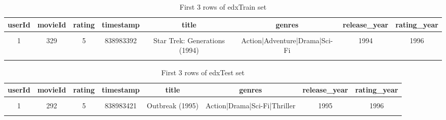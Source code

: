 \documentclass[
]{article}
\begin{document}
\begin{table}[H]

\caption{\label{tab:Table 2: first 3 rows of edxTrain set}First 3 rows of edxTrain set}
\centering
\fontsize{6.7}{8.7}\selectfont
\begin{tabular}[t]{|>{}c|||>{}c|||>{}c|||>{}c|||>{}c|||>{}c|||>{}c|||>{}c|}
\hline
userId & movieId & rating & timestamp & title & genres & release\_year & rating\_year\\
\hline
\cellcolor{gray!6}{1} & \cellcolor{gray!6}{185} & \cellcolor{gray!6}{5} & \cellcolor{gray!6}{838983525} & \cellcolor{gray!6}{Net, The (1995)} & \cellcolor{gray!6}{Action|Crime|Thriller} & \cellcolor{gray!6}{1995} & \cellcolor{gray!6}{1996}\\
\hline
1 & 329 & 5 & 838983392 & Star Trek: Generations (1994) & Action|Adventure|Drama|Sci-Fi & 1994 & 1996\\
\hline
\cellcolor{gray!6}{1} & \cellcolor{gray!6}{355} & \cellcolor{gray!6}{5} & \cellcolor{gray!6}{838984474} & \cellcolor{gray!6}{Flintstones, The (1994)} & \cellcolor{gray!6}{Children|Comedy|Fantasy} & \cellcolor{gray!6}{1994} & \cellcolor{gray!6}{1996}\\
\hline
\end{tabular}
\end{table}

\begin{table}[H]

\caption{\label{tab:Table 3: first 3 rows of edxTest set}First 3 rows of edxTest set}
\centering
\fontsize{8}{10}\selectfont
\begin{tabular}[t]{|>{}c|||>{}c|||>{}c|||>{}c|||>{}c|||>{}c|||>{}c|||>{}c|}
\hline
userId & movieId & rating & timestamp & title & genres & release\_year & rating\_year\\
\hline
\cellcolor{gray!6}{1} & \cellcolor{gray!6}{122} & \cellcolor{gray!6}{5} & \cellcolor{gray!6}{838985046} & \cellcolor{gray!6}{Boomerang (1992)} & \cellcolor{gray!6}{Comedy|Romance} & \cellcolor{gray!6}{1992} & \cellcolor{gray!6}{1996}\\
\hline
1 & 292 & 5 & 838983421 & Outbreak (1995) & Action|Drama|Sci-Fi|Thriller & 1995 & 1996\\
\hline
\cellcolor{gray!6}{1} & \cellcolor{gray!6}{316} & \cellcolor{gray!6}{5} & \cellcolor{gray!6}{838983392} & \cellcolor{gray!6}{Stargate (1994)} & \cellcolor{gray!6}{Action|Adventure|Sci-Fi} & \cellcolor{gray!6}{1994} & \cellcolor{gray!6}{1996}\\
\hline
\end{tabular}
\end{table}
\end{document}
